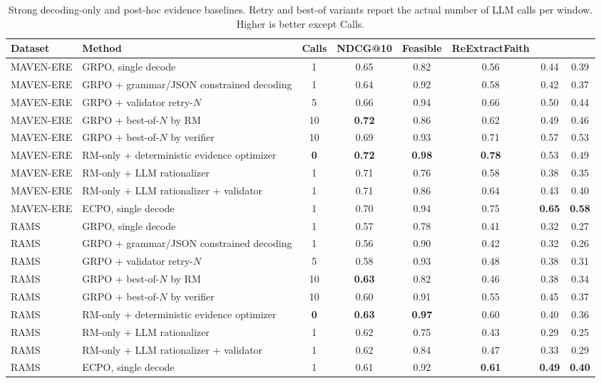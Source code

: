 \documentclass{article}
\newcommand{\ECPO}{\textsc{ECPO}}
\begin{document}
\begin{table}[t]
\centering
\caption{Strong decoding-only and post-hoc evidence baselines. Retry and best-of variants report the actual number of LLM calls per window. Higher is better except Calls.}
\label{tab:decoding_controls}
\small
\begin{adjustbox}{max width=\textwidth}
\begin{tabular}{l l c c c c c c}
\toprule
Dataset & Method & Calls & NDCG@10 & Feasible & ReExtractFaith & \EvidCons@10 & \CertNDCG@10 \\
\midrule
MAVEN-ERE & GRPO, single decode & 1 & 0.65 & 0.82 & 0.56 & 0.44 & 0.39 \\
MAVEN-ERE & GRPO + grammar/JSON constrained decoding & 1 & 0.64 & 0.92 & 0.58 & 0.42 & 0.37 \\
MAVEN-ERE & GRPO + validator retry-$N$ & 5 & 0.66 & 0.94 & 0.66 & 0.50 & 0.44 \\
MAVEN-ERE & GRPO + best-of-$N$ by RM & 10 & \textbf{0.72} & 0.86 & 0.62 & 0.49 & 0.46 \\
MAVEN-ERE & GRPO + best-of-$N$ by verifier & 10 & 0.69 & 0.93 & 0.71 & 0.57 & 0.53 \\
MAVEN-ERE & RM-only + deterministic evidence optimizer & \textbf{0} & \textbf{0.72} & \textbf{0.98} & \textbf{0.78} & 0.53 & 0.49 \\
MAVEN-ERE & RM-only + LLM rationalizer & 1 & 0.71 & 0.76 & 0.58 & 0.38 & 0.35 \\
MAVEN-ERE & RM-only + LLM rationalizer + validator & 1 & 0.71 & 0.86 & 0.64 & 0.43 & 0.40 \\
MAVEN-ERE & \ECPO, single decode & 1 & 0.70 & 0.94 & 0.75 & \textbf{0.65} & \textbf{0.58} \\
\midrule
RAMS & GRPO, single decode & 1 & 0.57 & 0.78 & 0.41 & 0.32 & 0.27 \\
RAMS & GRPO + grammar/JSON constrained decoding & 1 & 0.56 & 0.90 & 0.42 & 0.32 & 0.26 \\
RAMS & GRPO + validator retry-$N$ & 5 & 0.58 & 0.93 & 0.48 & 0.38 & 0.31 \\
RAMS & GRPO + best-of-$N$ by RM & 10 & \textbf{0.63} & 0.82 & 0.46 & 0.38 & 0.34 \\
RAMS & GRPO + best-of-$N$ by verifier & 10 & 0.60 & 0.91 & 0.55 & 0.45 & 0.37 \\
RAMS & RM-only + deterministic evidence optimizer & \textbf{0} & \textbf{0.63} & \textbf{0.97} & 0.60 & 0.40 & 0.36 \\
RAMS & RM-only + LLM rationalizer & 1 & 0.62 & 0.75 & 0.43 & 0.29 & 0.25 \\
RAMS & RM-only + LLM rationalizer + validator & 1 & 0.62 & 0.84 & 0.47 & 0.33 & 0.29 \\
RAMS & \ECPO, single decode & 1 & 0.61 & 0.92 & \textbf{0.61} & \textbf{0.49} & \textbf{0.40} \\
\bottomrule
\end{tabular}
\end{adjustbox}
\end{table}
\end{document}
